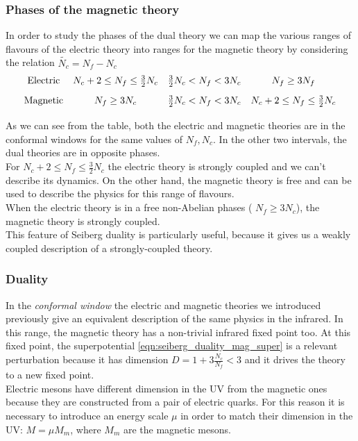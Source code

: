 \subsubsection{Phases of the magnetic theory}
In order to study the phases of the dual theory we can map the various ranges of flavours of the electric theory into ranges for the magnetic theory by considering the relation $\tilde{N_c} = N_f - N_c$
\begin{equation}
\begin{array}{c  c  c  c}
\hbox{Electric} & N_c +2 \leq N_f \leq \frac{3}{2}N_c &  \frac{3}{2}N_c  < N_f < 3 N_c & N_f \geq 3 N_f \\[3mm]
\hbox{Magnetic} & N_f \geq 3 N_c  &  \frac{3}{2}N_c  < N_f < 3 N_c &  N_c +2\leq N_f \leq \frac{3}{2} N_c  \\[2mm]
\end{array}
\end{equation}
As we can see from the table, both the electric and magnetic theories are in the conformal windows for the same values of $N_f,N_c$.
In the other two intervals, the dual theories are in opposite phases.
\\
For $N_c +2 \leq N_f \leq \frac{3}{2} N_c$ the electric theory is strongly coupled and we can't describe its dynamics. 
On the other hand, the magnetic theory is free and can be used to describe the physics for this range of flavours.\\
When the electric theory is in a free non-Abelian phases ( $N_f \geq 3 N_c$), the magnetic theory is strongly coupled.\\
This feature of Seiberg duality is particularly useful, because it gives us a weakly coupled description of a strongly-coupled theory.  

\subsubsection{Duality}
In the \emph{conformal window} the electric and magnetic theories we introduced previously give an equivalent description of the same physics in the infrared.
In this range, the magnetic theory has a non-trivial infrared fixed point too. 
At this fixed point, the superpotential \eqref{eqn:seiberg_duality_mag_super} is a relevant perturbation because it has dimension $D = 1 + 3 \frac{N_c}{N_f}  <3 $ and it drives the theory to a new fixed point.\\
Electric mesons have different dimension in the UV from the magnetic ones because they are constructed from a pair of electric quarks.
For this reason it is necessary to introduce an energy scale $\mu$ in order to match their dimension in the UV: $ M = \mu M_m$, where $M_m$ are the magnetic mesons.\\

